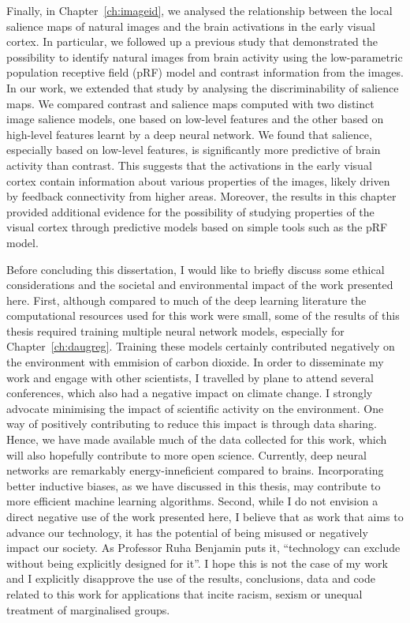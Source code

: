 {Finally, in Chapter~\ref{ch:imageid}, we analysed the relationship between the local salience maps of natural images and the brain activations in the early visual cortex. In particular, we followed up a previous study that demonstrated the possibility to identify natural images from brain activity using the low-parametric population receptive field (pRF) model and contrast information from the images. In our work, we extended that study by analysing the discriminability of salience maps. We compared contrast and salience maps computed with two distinct image salience models, one based on low-level features and the other based on high-level features learnt by a deep neural network. We found that salience, especially based on low-level features, is significantly more predictive of brain activity than contrast. This suggests that the activations in the early visual cortex contain information about various properties of the images, likely driven by feedback connectivity from higher areas. Moreover, the results in this chapter provided additional evidence for the possibility of studying properties of the visual cortex through predictive models based on simple tools such as the pRF model.

Before concluding this dissertation, I would like to briefly discuss some ethical considerations and the societal and environmental impact of the work presented here. First, although compared to much of the deep learning literature the computational resources used for this work were small, some of the results of this thesis required training multiple neural network models, especially for Chapter~\ref{ch:daugreg}. Training these models certainly contributed negatively on the environment with emmision of carbon dioxide. In order to disseminate my work and engage with other scientists, I travelled by plane to attend several conferences, which also had a negative impact on climate change. I strongly advocate minimising the impact of scientific activity on the environment. One way of positively contributing to reduce this impact is through data sharing. Hence, we have made available much of the data collected for this work, which will also hopefully contribute to more open science. Currently, deep neural networks are remarkably energy-inneficient compared to brains. Incorporating better inductive biases, as we have discussed in this thesis, may contribute to more efficient machine learning algorithms. Second, while I do not envision a direct negative use of the work presented here, I believe that as work that aims to advance our technology, it has the potential of being misused or negatively impact our society. As Professor Ruha Benjamin puts it, ``technology can exclude without being explicitly designed for it''. I hope this is not the case of my work and I explicitly disapprove the use of the results, conclusions, data and code related to this work for applications that incite racism, sexism or unequal treatment of marginalised groups.

}

